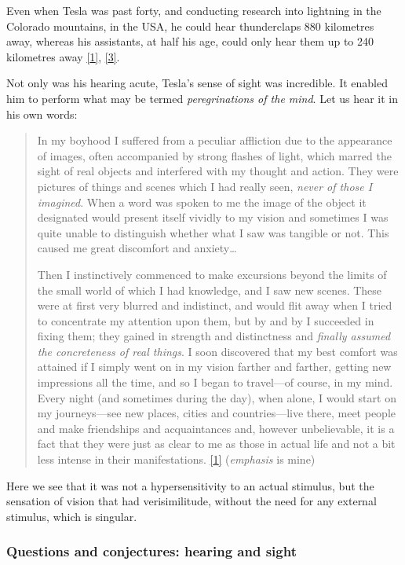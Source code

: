 \documentclass[
  a4paper,
]{article}
\begin{document}
Even when Tesla was past forty, and conducting research into lightning
in the Colorado mountains, in the USA, he could hear thunderclaps 880
kilometres away, whereas his assistants, at half his age, could only
hear them up to 240 kilometres away
\protect\hyperlink{ref-john83}{{[}1{]}},
\protect\hyperlink{ref-cheney81}{{[}3{]}}.

Not only was his hearing acute, Tesla's sense of sight was incredible.
It enabled him to perform what may be termed \emph{peregrinations of the
mind}. Let us hear it in his own words:

\begin{quote}
In my boyhood I suffered from a peculiar affliction due to the
appearance of images, often accompanied by strong flashes of light,
which marred the sight of real objects and interfered with my thought
and action. They were pictures of things and scenes which I had really
seen, \emph{never of those I imagined}. When a word was spoken to me the
image of the object it designated would present itself vividly to my
vision and sometimes I was quite unable to distinguish whether what I
saw was tangible or not. This caused me great discomfort and
anxiety\ldots{}

Then I instinctively commenced to make excursions beyond the limits of
the small world of which I had knowledge, and I saw new scenes. These
were at first very blurred and indistinct, and would flit away when I
tried to concentrate my attention upon them, but by and by I succeeded
in fixing them; they gained in strength and distinctness and
\emph{finally assumed the concreteness of real things}. I soon
discovered that my best comfort was attained if I simply went on in my
vision farther and farther, getting new impressions all the time, and so
I began to travel---of course, in my mind. Every night (and sometimes
during the day), when alone, I would start on my journeys---see new
places, cities and countries---live there, meet people and make
friendships and acquaintances and, however unbelievable, it is a fact
that they were just as clear to me as those in actual life and not a bit
less intense in their manifestations.
\protect\hyperlink{ref-john83}{{[}1{]}} (\emph{emphasis} is mine)
\end{quote}

Here we see that it was not a hypersensitivity to an actual stimulus,
but the sensation of vision that had verisimilitude, without the need
for any external stimulus, which is singular.

\hypertarget{questions-and-conjectures-hearing-and-sight}{%
\subsubsection{Questions and conjectures: hearing and
sight}\label{questions-and-conjectures-hearing-and-sight}}
\end{document}
